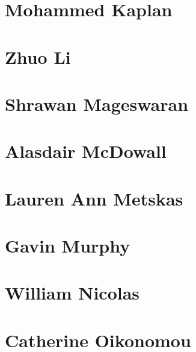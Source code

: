 \documentclass[]{tufte-book}
\begin{document}
\hypertarget{mohammed_kaplan}{%
\section*{Mohammed Kaplan}\label{mohammed_kaplan}}

\hypertarget{zhuo_li}{%
\section*{Zhuo Li}\label{zhuo_li}}

\hypertarget{shrawan_mageswaran}{%
\section*{Shrawan Mageswaran}\label{shrawan_mageswaran}}

\hypertarget{alasdair_mcdowall}{%
\section*{Alasdair McDowall}\label{alasdair_mcdowall}}

\hypertarget{lauren_ann_metskas}{%
\section*{Lauren Ann Metskas}\label{lauren_ann_metskas}}

\hypertarget{gavin_murphy}{%
\section*{Gavin Murphy}\label{gavin_murphy}}

\hypertarget{william_nicolas}{%
\section*{William Nicolas}\label{william_nicolas}}

\hypertarget{catherine_oikonomou}{%
\section*{Catherine Oikonomou}\label{catherine_oikonomou}}
\end{document}
